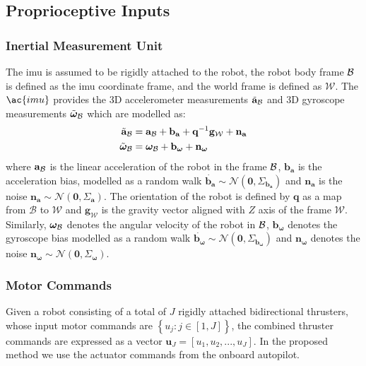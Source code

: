 
\subsection{Proprioceptive Inputs}
\subsubsection{Inertial Measurement Unit} The \ac{imu} is assumed to be rigidly attached to the robot, the robot body frame $\mathcal{B}$ is defined as the \ac{imu} coordinate frame, and the world frame is defined as $\mathcal{W}$. The $\ac{imu}$ provides the 3D accelerometer measurements $\tilde{\mathbf{a}}_{\mathcal{B}}$ and 3D gyroscope measurements $\tilde{\boldsymbol{\omega}}_{\mathcal{B}}$ which are modelled as:
\begin{subequations}
\begin{align}
    \tilde{\mathbf{a}}_{\mathcal{B}}&=\mathbf{a}_{\mathcal{B}} + \mathbf{b}_{\mathbf{a}} + \mathbf{q}^{-1}\mathbf{g}_{\mathcal{W}} + \mathbf{n}_{\mathbf{a}}\\
    \tilde{\boldsymbol{\omega}}_{\mathcal{B}}&=\boldsymbol{\omega}_{\mathcal{B}} + \mathbf{b}_{\boldsymbol{\omega}} + \mathbf{n}_{\boldsymbol{\omega}}
\end{align}
\end{subequations}
where $\mathbf{a}_{\mathcal{B}}$ is the linear acceleration of the robot in the frame $\mathcal{B}$, $\mathbf{b}_\mathbf{a}$ is the acceleration bias, modelled as a random walk $\dot{\mathbf{b}_\mathbf{a}}\sim\mathcal{N}(\mathbf{0}, \Sigma_{\mathbf{b}_{\mathbf{a}}})$ and $\mathbf{n}_{\mathbf{a}}$ is the noise $\mathbf{n}_{\mathbf{a}}\sim\mathcal{N}\left(\boldsymbol{0},\Sigma_{\mathbf{a}}\right)$. The orientation of the robot is defined by $\mathbf{q}$ as a map from $\mathcal{B}$ to $\mathcal{W}$ and $\mathbf{g}_{\mathcal{W}}$ is the gravity vector aligned with $Z$ axis of the frame $\mathcal{W}$. Similarly, $\boldsymbol{\omega}_{\mathcal{B}}$ denotes the angular velocity of the robot in $\mathcal{B}$, $\mathbf{b}_{\boldsymbol{\omega}}$ denotes the gyroscope bias modelled as a random walk $\dot{\mathbf{b}_{\boldsymbol{\omega}}}\sim\mathcal{N}\left(\mathbf{0}, \Sigma_{\mathbf{b}_{\boldsymbol{\omega}}}\right)$ and $\mathbf{n}_{\boldsymbol{\omega}}$ denotes the noise $\mathbf{n}_{\boldsymbol{\omega}}\sim\mathcal{N}\left(\mathbf{0}, \Sigma_{\boldsymbol{\omega}}\right)$.

\subsubsection{Motor Commands} Given a robot consisting of a total of $J$ rigidly attached bidirectional thrusters, whose input motor commands are $\left\{u_{j}: j\in\left[1, J\right]\right\}$, the combined thruster commands are expressed as a vector $\mathbf{u}_{J}=\left[u_{1}, u_{2},..., u_{J}\right]$. In the proposed method we use the actuator commands from the onboard autopilot.
